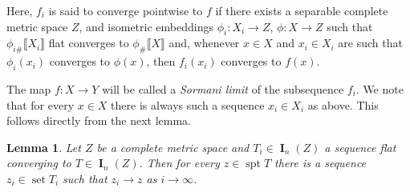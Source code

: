 \documentclass[reqno]{amsart}
\newtheorem{lemma}[theorem]{Lemma}
\numberwithin{equation}{section}
\newcommand{\spt}{\operatorname{spt}}
\newcommand{\bb}[1]{\llbracket #1\rrbracket}
\DeclareMathOperator{\bI}{\mathbf{I}}
\DeclareMathOperator{\set}{set}
\begin{document}
Here, $f_i$ is said to converge pointwise to $f$ if there exists a separable complete metric space \(Z\), and isometric embeddings \(\phi_i \colon X_i \to Z\), \(\phi \colon X\to Z\) such that \(\phi_{i\#}\bb{X_i}\) flat converges to \(\phi_{\#}\bb{X}\) and, whenever \(x\in X\) and \(x_i\in X_i\) are such that \(\phi_i(x_i)\) converges to \(\phi(x)\), then \(f_i(x_i)\) converges to \(f(x)\). 

The map \(f\colon X\to Y\) will be called a \emph{Sormani limit} of the subsequence \(f_{i}\). We note that for every \(x\in X\) there is always such a sequence \(x_i\in X_i\) as above. This follows directly from the next lemma.

\begin{lemma}\label{lem:points-in-support-are-limits}
Let \(Z\) be a complete metric space and \(T_i\in \bI_n(Z)\) a sequence flat converging to \(T\in \bI_n(Z)\). Then for every \(z\in \spt T\) there is a sequence \(z_i\in \set T_i\) such that \(z_i\to z\) as \(i\to \infty\). 
\end{lemma}
\end{document}
